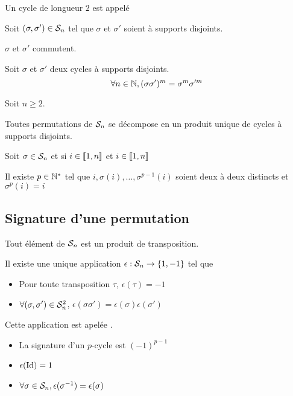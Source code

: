 \begin{dfn}
  Un cycle de longueur $2$ est appelé 
\end{dfn}

\begin{prp}
  Soit $(\sigma, \sigma') \in \mathcal{S}_n$ tel que $\sigma$ et $\sigma'$ soient à supports disjoints.
  
  $\sigma$ et $\sigma'$ commutent.
\end{prp}

\begin{cor}
  Soit $\sigma$ et $\sigma'$ deux cycles à supports disjoints.
  \[
    \forall n \in \mathbb{N}, (\sigma \sigma')^m = \sigma^m \sigma'^m
  \]
\end{cor}

\begin{thm}
  Soit $n \geq 2$.

  Toutes permutations de $\mathcal{S}_n$ se décompose en un produit unique de cycles à
  supports disjoints.
\end{thm}

\begin{prp}
  Soit $\sigma \in \mathcal{S}_n$ et si $i \in \llbracket 1, n \rrbracket$ et $i \in \llbracket 1, n \rrbracket$
  
  Il existe $p \in \mathbb{N}^*$ tel que $i, \sigma(i), \ldots, \sigma^{p - 1}(i)$ soient deux à deux
  distincts et $\sigma^p(i) = i$
\end{prp}

\subsection{Signature d'une permutation}

\begin{thm}
  Tout élément de $\mathcal{S}_n$ est un produit de transposition.
\end{thm}

\begin{dfn}
  Il existe une unique application $\epsilon : \mathcal{S}_n \to \{ 1, -1 \}$
  tel que
  \begin{itemize}
    \item Pour toute transposition $\tau$, $\epsilon(\tau) = -1$
    \item $\forall (\sigma, \sigma') \in \mathcal{S}_n^2$, $\epsilon(\sigma \sigma') = \epsilon(\sigma)\epsilon(\sigma')$
  \end{itemize}
  Cette application est apelée .
\end{dfn}

\begin{prp}
  \begin{itemize}
    \item La signature d'un $p$-cycle est $(-1)^{p - 1}$
    \item $\epsilon(\operatorname{Id}) = 1$
    \item $\forall \sigma \in \mathcal{S}_n, \epsilon(\sigma^{-1}) = \epsilon(\sigma)$
  \end{itemize}
\end{prp}

